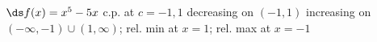 {$\ds f(x) =x^5-5x$
}
{c.p. at $c=-1,1$
decreasing on $(-1,1)$
increasing on $(-\infty,-1) \cup (1,\infty)$;
rel. min at $x=1$;
rel. max at $x=-1$
}
